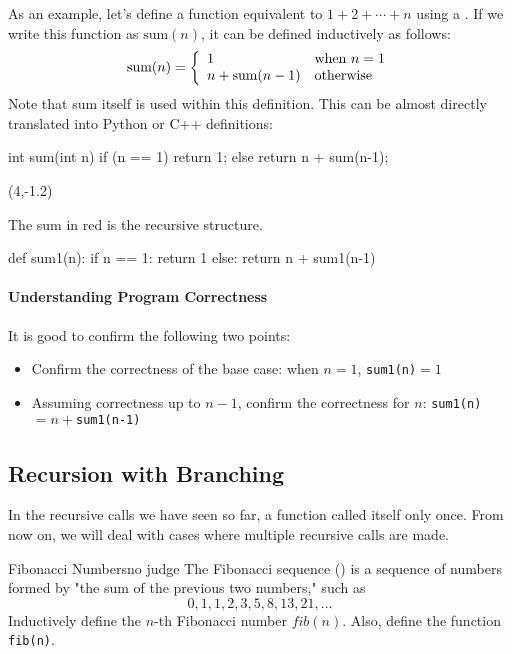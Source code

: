 As an example, let's define a function equivalent to $1+2+\cdots+n$ using a .
If we write this function as $\mbox{sum}(n)$, it can be defined inductively as follows:
\[
        \mbox{sum}(n) = \left\{
        \begin{array}[c]{ll}
          1 & \mbox{when $n=1$}\\
          n + \mbox{sum}(n-1) & \mbox{otherwise}
        \end{array}
      \right.
\]
Note that sum itself is used within this definition.
This can be almost directly translated into Python or C++ definitions:
\begin{cbox}[emph={sum}]
int sum(int n) {
  if (n == 1) return 1;
  else return n + sum(n-1);
}
\end{cbox}
\begin{textblock}{3}(4,-1.2)
\begin{shaded*}
\noindent
The \textcolor{ired}{sum} in red is the recursive structure.
\end{shaded*}
\end{textblock}
\begin{pybox}[emph={sum1}]
def sum1(n):
    if n == 1:
        return 1
    else:
        return n + sum1(n-1)
\end{pybox}

\paragraph{Understanding Program Correctness} It is good to confirm the following two points:
\begin{itemize}
\item Confirm the correctness of the base case: when $n=1$, \texttt{sum1(n)}$=1$
\item Assuming correctness up to $n-1$, confirm the correctness for $n$: \texttt{sum1(n)}$=n+$\texttt{sum1(n-1)}
\end{itemize}

\subsection{Recursion with Branching}\label{section:branching}
In the recursive calls we have seen so far, a function called itself only once. From now on, we will deal with cases where multiple recursive calls are made.


\begin{psbox}{Fibonacci Numbers}{no judge}
The Fibonacci sequence () is a sequence of numbers formed by "the sum of the previous two numbers," such as
\[
        0, 1, 1, 2, 3, 5, 8, 13, 21, \ldots
\]
Inductively define the $n$-th Fibonacci number $\mathit{fib}(n)$.
Also, define the function \texttt{fib(n)}.
\end{psbox}

